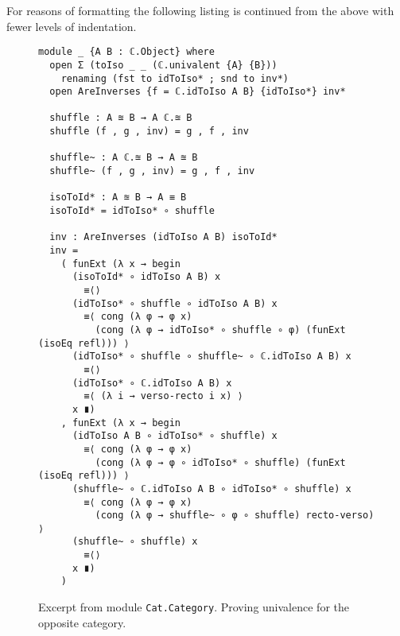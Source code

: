 \clearpage
For reasons of formatting the following listing is continued from the above with
fewer levels of indentation.
%
\begin{figure}[h]
\begin{Verbatim}
module _ {A B : ℂ.Object} where
  open Σ (toIso _ _ (ℂ.univalent {A} {B}))
    renaming (fst to idToIso* ; snd to inv*)
  open AreInverses {f = ℂ.idToIso A B} {idToIso*} inv*

  shuffle : A ≊ B → A ℂ.≊ B
  shuffle (f , g , inv) = g , f , inv

  shuffle~ : A ℂ.≊ B → A ≊ B
  shuffle~ (f , g , inv) = g , f , inv

  isoToId* : A ≊ B → A ≡ B
  isoToId* = idToIso* ∘ shuffle

  inv : AreInverses (idToIso A B) isoToId*
  inv =
    ( funExt (λ x → begin
      (isoToId* ∘ idToIso A B) x
        ≡⟨⟩
      (idToIso* ∘ shuffle ∘ idToIso A B) x
        ≡⟨ cong (λ φ → φ x)
          (cong (λ φ → idToIso* ∘ shuffle ∘ φ) (funExt (isoEq refl))) ⟩
      (idToIso* ∘ shuffle ∘ shuffle~ ∘ ℂ.idToIso A B) x
        ≡⟨⟩
      (idToIso* ∘ ℂ.idToIso A B) x
        ≡⟨ (λ i → verso-recto i x) ⟩
      x ∎)
    , funExt (λ x → begin
      (idToIso A B ∘ idToIso* ∘ shuffle) x
        ≡⟨ cong (λ φ → φ x)
          (cong (λ φ → φ ∘ idToIso* ∘ shuffle) (funExt (isoEq refl))) ⟩
      (shuffle~ ∘ ℂ.idToIso A B ∘ idToIso* ∘ shuffle) x
        ≡⟨ cong (λ φ → φ x)
          (cong (λ φ → shuffle~ ∘ φ ∘ shuffle) recto-verso) ⟩
      (shuffle~ ∘ shuffle) x
        ≡⟨⟩
      x ∎)
    )
\end{Verbatim}
\caption{Excerpt from module \texttt{Cat.Category}. Proving univalence for the opposite category.}
\end{figure}
\clearpage
